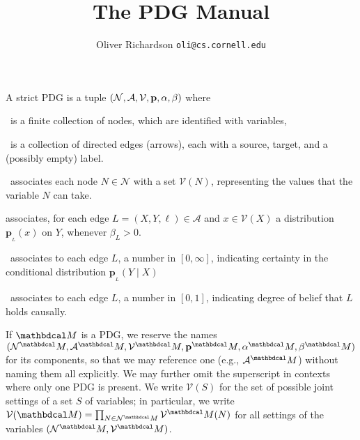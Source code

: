 \documentclass{article}
\title{The PDG Manual}
\author{Oliver Richardson  \texttt{oli@cs.cornell.edu}}
\newcommand{\bp}[1][L]{\mathbf{p}_{\!_#1\!}}
\newcommand{\V}{\mathcal V}
\newcommand{\N}{\mathcal N}
\newcommand{\Ed}{\mathcal A}
\newcommand{\dg}[1]{\mathbdcal #1}
\begin{document}
	\maketitle
	\tableofcontents
	\listoffigures
	\listoftheorems
	\clearpage

	\def\pdgvars[#1]{(\N#1, \Ed#1, \V#1, \mat p#1, \alpha#1,\beta#1)}
	\begin{defn}[sPDG]\label{def:sPDG}
		A strict PDG is a tuple $\pdgvars[]$ where
		\begin{description}[nosep]
			\item[$\N$]~is a finite collection of nodes, which are identified with variables,
			\item[$\Ed$]~is a collection of directed edges (arrows), each with a source, target, and a (possibly empty) label.
			\item[$\V$]~associates each node $N \in \N$ with a set $\V(N)$,
			representing the values that the variable $N$ can take. 
			\item[$\mathbf p$] associates, for each edge $L = (X,Y, \ell) \in \Ed$ and $x \in \V(X)$ a distribution $\bp(x)$ on $Y$, whenever $\beta_L > 0$.
			\item[$\beta$]~associates to each edge $L$, a number in $[0,\infty]$, indicating certainty in the conditional distribution $\bp(Y \mid X)$ 
			\item[$\alpha$]~associates to each edge $L$, a number in $[0,1]$, indicating degree of belief that $L$ holds causally.
		\end{description}
		\vspace{-1.4em}
	\end{defn}

	If $\dg M$ is a PDG, we reserve the names $\pdgvars[^\dg M]$
	for its components, so that we may reference one (e.g.,
	$\Ed^\dg M$) without naming them all explicitly. We may further omit the superscript in contexts where only one PDG is present. 
	We write $\V(S)$ for the set of possible joint settings of a set $S$
	of variables; in particular, 
	we write $\V(\dg M)
	= \prod_{N \in \N^\dg M} \V^\dg M(N)$
	for all settings of the variables $(\N^\dg M, \V^\dg M)$.
	
\end{document}
